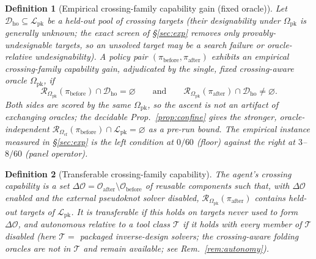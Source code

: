 \documentclass[11pt]{article}
\newtheorem{definition}{Definition}
\newcommand{\PK}{\ensuremath{\mathcal{L}_{\mathrm{pk}}}}
\newcommand{\Ocf}{\ensuremath{\Omega_{\mathrm{cf}}}}
\newcommand{\Opk}{\ensuremath{\Omega_{\mathrm{pk}}}}
\newcommand{\Rze}[2]{\ensuremath{\mathcal{R}_{#1}(#2)}}
\begin{document}
\begin{definition}[Empirical crossing-family capability gain (fixed oracle)]\label{def:ascent}
Let $\mathcal D_{\mathrm{ho}}\subseteq\PK$ be a held-out pool of crossing targets (their designability under
$\Opk$ is generally unknown; the exact screen of \S\ref{sec:exp} removes only \emph{provably}-undesignable
targets, so an unsolved target may be a search failure \emph{or} oracle-relative undesignability). A policy
pair $(\pi_{\mathrm{before}},\pi_{\mathrm{after}})$ exhibits an empirical crossing-family capability gain,
adjudicated by the \emph{single, fixed} crossing-aware oracle $\Opk$, if
\begin{equation}\label{eq:ascent}
  \Rze{\Opk}{\pi_{\mathrm{before}}}\cap\mathcal D_{\mathrm{ho}}=\varnothing
  \qquad\text{and}\qquad
  \Rze{\Opk}{\pi_{\mathrm{after}}}\cap\mathcal D_{\mathrm{ho}}\neq\varnothing .
\end{equation}
Both sides are scored by the \emph{same} $\Opk$, so the ascent is not an artifact of exchanging oracles; the
decidable Prop.~\ref{prop:confine} gives the stronger, oracle-independent
$\Rze{\Ocf}{\pi_{\mathrm{before}}}\cap\PK=\varnothing$ as a pre-run bound. The empirical instance measured in
\S\ref{sec:exp} is the left condition at $0/60$ (floor) against the right at $3$--$8/60$ (panel operator).
\end{definition}

\begin{definition}[Transferable crossing-family capability]\label{def:cap}
The agent's \emph{crossing capability} is a set $\Delta\mathcal{O}=\mathcal{O}_{\mathrm{after}}\setminus
\mathcal{O}_{\mathrm{before}}$ of reusable components such that, with $\Delta\mathcal{O}$ enabled and the
external pseudoknot solver disabled, $\Rze{\Opk}{\pi_{\mathrm{after}}}$ contains \emph{held-out} targets of
$\PK$. It is \emph{transferable} if this holds on targets never used to form $\Delta\mathcal{O}$, and
\emph{autonomous relative to a tool class $\mathcal T$} if it holds with every member of $\mathcal T$ disabled
(here $\mathcal T=$ packaged inverse-design solvers; the crossing-aware folding oracles are \emph{not} in
$\mathcal T$ and remain available; see Rem.~\ref{rem:autonomy}).
\end{definition}
\end{document}
